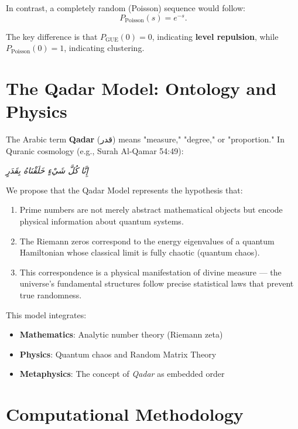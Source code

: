 \documentclass[12pt,a4paper]{article}
\begin{document}
In contrast, a completely random (Poisson) sequence would follow:
\begin{equation}
P_{\text{Poisson}}(s) = e^{-s}.
\end{equation}

The key difference is that $P_{\text{GUE}}(0) = 0$, indicating \textbf{level repulsion}, while $P_{\text{Poisson}}(0) = 1$, indicating clustering.

\section{The Qadar Model: Ontology and Physics}

The Arabic term \textbf{Qadar} (قدر) means "measure," "degree," or "proportion." In Quranic cosmology (e.g., Surah Al-Qamar 54:49):
\begin{center}
\textit{إِنَّا كُلَّ شَيْءٍ خَلَقْنَاهُ بِقَدَرٍ}\\
\end{center}

We propose that the Qadar Model represents the hypothesis that:
\begin{enumerate}
    \item Prime numbers are not merely abstract mathematical objects but encode physical information about quantum systems.
    \item The Riemann zeros correspond to the energy eigenvalues of a quantum Hamiltonian whose classical limit is fully chaotic (quantum chaos).
    \item This correspondence is a physical manifestation of divine measure — the universe's fundamental structures follow precise statistical laws that prevent true randomness.
\end{enumerate}

This model integrates:
\begin{itemize}
    \item \textbf{Mathematics}: Analytic number theory (Riemann zeta)
    \item \textbf{Physics}: Quantum chaos and Random Matrix Theory
    \item \textbf{Metaphysics}: The concept of \textit{Qadar} as embedded order
\end{itemize}

\section{Computational Methodology}
\end{document}
